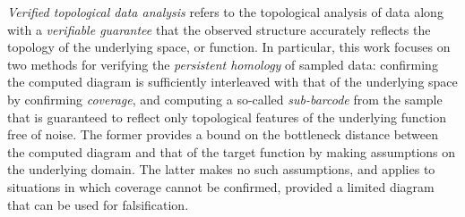 
\emph{Verified topological data analysis} refers to the topological analysis of data along with a \emph{verifiable guarantee} that the observed structure accurately reflects the topology of the underlying space, or function.
In particular, this work focuses on two methods for verifying the \emph{persistent homology} of sampled data: confirming the computed diagram is sufficiently interleaved with that of the underlying space by confirming \emph{coverage}, and computing a so-called \emph{sub-barcode} from the sample that is guaranteed to reflect only topological features of the underlying function free of noise.
The former provides a bound on the bottleneck distance between the computed diagram and that of the target function by making assumptions on the underlying domain.
The latter makes no such assumptions, and applies to situations in which coverage cannot be confirmed, provided a limited diagram that can be used for falsification.
